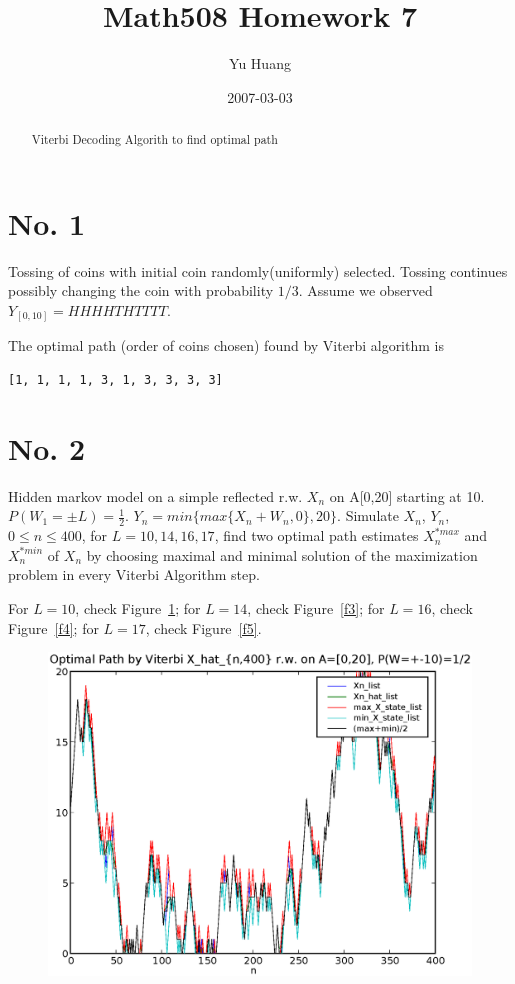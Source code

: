 \documentclass[a4paper,10pt]{article}
\title{Math508 Homework 7}
\author{Yu Huang}
\date{2007-03-03}
\begin{document}
\maketitle

\begin{abstract}
Viterbi Decoding Algorith to find optimal path
\end{abstract}

\section{No. 1}
Tossing of coins with initial coin randomly(uniformly) selected. Tossing continues possibly changing the coin with probability $1/3$. Assume we observed $Y_{[0,10]} = HHHHTHTTTT$.

The optimal path (order of coins chosen) found by Viterbi algorithm is 
\begin{verbatim}
[1, 1, 1, 1, 3, 1, 3, 3, 3, 3]
\end{verbatim}


\section{No. 2}
Hidden markov model on a simple reflected r.w. $X_n$ on A[0,20] starting at 10. $P(W_1 = \pm L) = \frac{1}{2}$. $Y_n = min\{max\{X_n+W_n, 0\}, 20\}$. Simulate $X_n$, $Y_n$, $0 \le n \le 400$, for $L=10,14,16,17$, find two optimal path estimates $X^{\ast max}_n$ and $X^{\ast min}_n$ of $X_n$ by choosing maximal and minimal solution of the maximization problem in every Viterbi Algorithm step.

For $L=10$, check Figure~\ref{f2}; for $L=14$, check Figure~\ref{f3}; for $L=16$, check Figure~\ref{f4}; for $L=17$, check Figure~\ref{f5}.

\begin{figure}[p]
\includegraphics[width=1\textwidth]{hw7_2_K_20_L_10_T_400.eps}
\caption{}\label{f2}
\end{figure}
\end{document}
